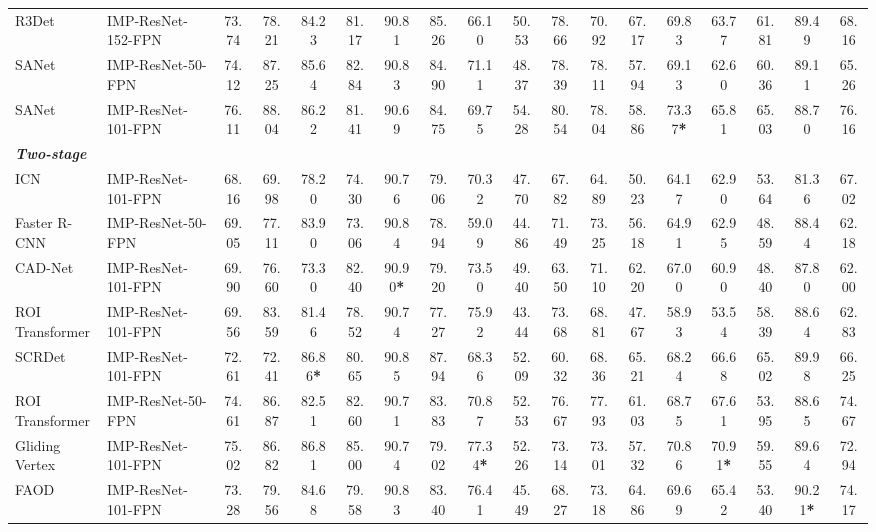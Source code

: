 \documentclass[10pt, journal,twoside]{IEEEtran}
\begin{document}
\begin{table*}[ht]
\begin{threeparttable}
{\begin{tabular}{l|l|c|c|c|c|c|c|c|c|c|c|c|c|c|c|c|c}
  R3Det \cite{r3det} & IMP-ResNet-152-FPN & 73.74 & 78.21 & 84.23 & 81.17 & 90.81 & 85.26 & 66.10 & 50.53 & 78.66 & 70.92 & 67.17 & 69.83 & 63.77 & 61.81 & 89.49 & 68.16 \\
  SANet \cite{aod_2022_tgrs_s2anet} & IMP-ResNet-50-FPN & 74.12 & 87.25 & 85.64 & 82.84 & 90.83 & 84.90 & 71.11 & 48.37 & 78.39 & 78.11  & 57.94 & 69.13 & 62.60 & 60.36 & 89.11 & 65.26 \\
  SANet \cite{aod_2022_tgrs_s2anet} & IMP-ResNet-101-FPN & 76.11 & 88.04 & 86.22 & 81.41 & 90.69 & 84.75 & 69.75 & 54.28 & 80.54 & 78.04  & 58.86 & 73.37\textbf{*} & 65.81 & 65.03 & 88.70 & 76.16 \\
  \hline
  \bfseries \textit{Two-stage} & \multicolumn{17}{c}{}\\
  \hline
  ICN \cite{aod_2018_acc_icn} & IMP-ResNet-101-FPN & 68.16 & 69.98 & 78.20 & 74.30 & 90.76 & 79.06 & 70.32 & 47.70 & 67.82 & 64.89 & 50.23 & 64.17 & 62.90 & 53.64 & 81.36 & 67.02 \\
  Faster R-CNN \cite{FasterRCNN}  & IMP-ResNet-50-FPN & 69.05 & 77.11 & 83.90 & 73.06 & 90.84 & 78.94 & 59.09 & 44.86 & 71.49 & 73.25 & 56.18 & 64.91 & 62.95 & 48.59 & 88.44 & 62.18 \\
  CAD-Net \cite{aod_2019_tgrs_cadnet} & IMP-ResNet-101-FPN & 69.90 & 76.60 & 73.30 & 82.40 & 90.90\textbf{*} & 79.20 & 73.50 & 49.40 & 63.50 & 71.10 & 62.20 & 67.00 & 60.90 & 48.40 & 87.80 & 62.00 \\
  ROI Transformer \cite{roi_transformer} & IMP-ResNet-101-FPN & 69.56 & 83.59 & 81.46 & 78.52 & 90.74 & 77.27 & 75.92 & 43.44 & 73.68 & 68.81 & 47.67 & 58.93 & 53.54 & 58.39 & 88.64 & 62.83 \\
  SCRDet \cite{scrdet} & IMP-ResNet-101-FPN & 72.61 & 72.41 & 86.86\textbf{*} & 80.65 & 90.85 & 87.94 & 68.36 & 52.09 & 60.32 & 68.36 & 65.21 & 68.24 & 66.68 & 65.02 & 89.98 & 66.25 \\
  ROI Transformer  \cite{roi_transformer} & IMP-ResNet-50-FPN & 74.61 & 86.87 & 82.51 & 82.60 & 90.71 & 83.83 & 70.87 & 52.53 & 76.67 & 77.93 & 61.03 & 68.75 & 67.61 & 53.95 & 88.65 & 74.67 \\
  Gliding Vertex \cite{glid_vertex} & IMP-ResNet-101-FPN & 75.02 & 86.82 & 86.81 & 85.00 & 90.74 & 79.02 & 77.34\textbf{*} & 52.26 & 73.14 & 73.01 & 57.32 & 70.86 & 70.91\textbf{*} & 59.55 & 89.64 & 72.94 \\
  FAOD \cite{aod_2019_icip_faod} & IMP-ResNet-101-FPN & 73.28 & 79.56 & 84.68 & 79.58 & 90.83 & 83.40 & 76.41 & 45.49 &  68.27 & 73.18 & 64.86 & 69.69 & 65.42 & 53.40 & 90.21\textbf{*} & 74.17 \\

\end{tabular}}
\end{threeparttable}
\end{table*}
\end{document}
